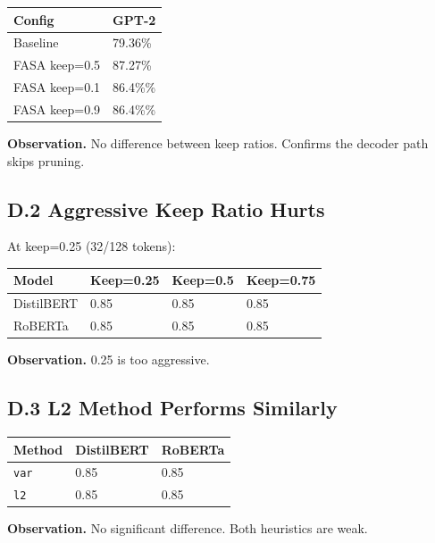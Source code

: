 \begin{table}[H]
\centering
\small
\begin{tabular}{ll}
\toprule
\textbf{Config} & \textbf{GPT-2} \\
\midrule
Baseline & 79.36\% \\
FASA keep=0.5 & 87.27\% \\
FASA keep=0.1 & 86.4\%\% \\
FASA keep=0.9 & 86.4\%\% \\
\bottomrule
\end{tabular}
\end{table}

\textbf{Observation.} No difference between keep ratios. Confirms the decoder 
path skips pruning.

\subsection{D.2 Aggressive Keep Ratio Hurts}

At keep=0.25 (32/128 tokens):

\begin{table}[H]
\centering
\small
\begin{tabular}{llll}
\toprule
\textbf{Model} & \textbf{Keep=0.25} & \textbf{Keep=0.5} & \textbf{Keep=0.75} \\
\midrule
DistilBERT & 0.85 & 0.85 & 0.85 \\
RoBERTa & 0.85 & 0.85 & 0.85 \\
\bottomrule
\end{tabular}
\end{table}

\textbf{Observation.} 0.25 is too aggressive.

\subsection{D.3 L2 Method Performs Similarly}

\begin{table}[H]
\centering
\small
\begin{tabular}{lll}
\toprule
\textbf{Method} & \textbf{DistilBERT} & \textbf{RoBERTa} \\
\midrule
\texttt{var} & 0.85 & 0.85 \\
\texttt{l2} & 0.85 & 0.85 \\
\bottomrule
\end{tabular}
\end{table}

\textbf{Observation.} No significant difference. Both heuristics are weak.

